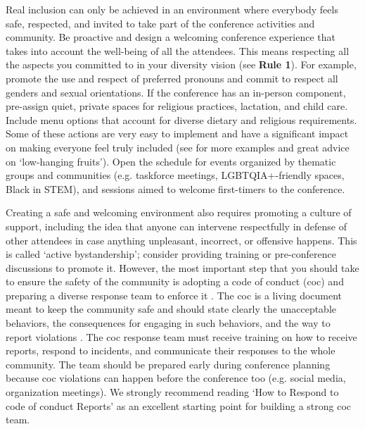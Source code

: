 \documentclass[10pt,letterpaper]{article}
\begin{document}
Real inclusion can only be achieved in an environment where everybody feels safe, respected, and invited to take part of the conference activities and community. Be proactive and design a welcoming conference experience that takes into account the well-being of all the attendees. This means respecting all the aspects you committed to in your diversity vision (see \textbf{Rule 1}). For example, promote the use and respect of preferred pronouns and commit to respect all genders and sexual orientations. If the conference has an in-person component, pre-assign quiet, private spaces for religious practices, lactation, and child care. Include menu options that account for diverse dietary and religious requirements.
Some of these actions are very easy to implement and have a significant impact on making everyone feel truly included (see \cite{numfocus_discover_2021} for more examples and  great advice on `low-hanging fruits').
Open the schedule for events organized by thematic groups and communities (e.g. taskforce meetings, LGBTQIA+-friendly spaces, Black in STEM), and sessions aimed to welcome first-timers to the conference.

Creating a safe and welcoming environment also requires promoting a culture of support, including the idea that anyone can intervene respectfully in defense of other attendees in case anything unpleasant, incorrect, or offensive happens.
This is called `active bystandership'; consider providing training or pre-conference discussions to promote it.
However, the most important step that you should take to ensure the safety of the community is
adopting a code of conduct (coc) and preparing a diverse response team to enforce it \cite{favaroYourScienceConference2016}.
The coc is a living document meant to keep the community safe and should state clearly the unacceptable behaviors, the consequences for engaging in such behaviors, and the way to report violations \cite{auroraHowRespondCode2019}.
The coc response team must receive training on how to receive reports, respond to incidents, and communicate their responses to the whole community. The team should be prepared early during conference planning because coc violations can happen before the conference too (e.g. social media, organization meetings).  
We strongly recommend reading `How to Respond to code of conduct Reports' \cite{auroraHowRespondCode2019} as an excellent starting point for building a strong coc team.
 
\end{document}
